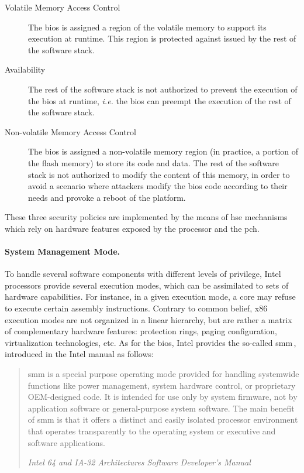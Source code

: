 \begin{description}
\item [Volatile Memory Access Control]
  The \ac{bios} is assigned a region of the volatile memory to support its
  execution at runtime. This region is protected against \IOs issued by the rest
  of the software stack.
\item [Availability]
  The rest of the software stack is not authorized to prevent the execution of
  the \ac{bios} at runtime, \emph{i.e.} the \ac{bios} can preempt the execution
  of the rest of the software stack.
\item [Non-volatile Memory Access Control]
  The \ac{bios} is assigned a non-volatile memory region (in practice, a portion
  of the flash memory) to store its code and data.
  The rest of the software stack is not authorized to modify the content of this
  memory, in order to avoid a scenario where attackers modify the \ac{bios} code
  according to their needs and provoke a reboot of the platform.
\end{description}

These three security policies are implemented by the means of \ac{hse}
mechanisms which rely on hardware features exposed by the processor and the
\ac{pch}.
%

\paragraph{System Management Mode.}
%
To handle several software components with different levels of privilege, Intel
processors provide several execution modes, which can be assimilated to sets of
hardware capabilities.
%
For instance, in a given execution mode, a core may refuse to execute certain
assembly instructions.
%
Contrary to common belief, x86 execution modes are not organized in a linear
hierarchy, but are rather a matrix of complementary hardware features:
protection rings, paging configuration, virtualization technologies, etc.
%
As for the \ac{bios}, Intel provides the so-called \ac{smm}\,\cite[Volume 3,
Chapter 34]{intel2014manual}, introduced in the Intel manual as follows:


\begin{quote}
  \ac{smm} is a special purpose operating mode provided for handling systemwide
  functions like power management, system hardware control, or proprietary
  OEM-designed code.
  It is intended for use only by system firmware, not by application software or
  general-purpose system software.
  The main benefit of \ac{smm} is that it offers a distinct and easily isolated
  processor environment that operates transparently to the operating system or
  executive and software applications.

  \hfill \small \emph{Intel 64 and IA-32 Architectures Software Developer’s
    Manual}
\end{quote}

